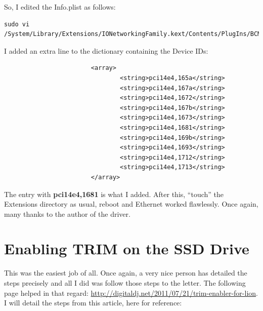 \documentclass[11pt]{article}
\begin{document}
So, I edited the Info.plist as follows:
\begin{verbatim}
sudo vi /System/Library/Extensions/IONetworkingFamily.kext/Contents/PlugIns/BCM5722D.kext/Contents/Info.plist
\end{verbatim}
I added an extra line to the dictionary containing the Device IDs:
\begin{verbatim}
                        <array>
                                <string>pci14e4,165a</string>
                                <string>pci14e4,167a</string>
                                <string>pci14e4,1672</string>
                                <string>pci14e4,167b</string>
                                <string>pci14e4,1673</string>
                                <string>pci14e4,1681</string>
                                <string>pci14e4,169b</string>
                                <string>pci14e4,1693</string>
                                <string>pci14e4,1712</string>
                                <string>pci14e4,1713</string>
                        </array>
\end{verbatim}
The entry with {\bf pci14e4,1681} is what I added.  After this, ``touch'' the Extensions directory as usual, reboot and Ethernet worked flawlessly.  Once again, many thanks to the author of the driver.

\section{Enabling TRIM on the SSD Drive}

This was the easiest job of all.  Once again, a very nice person has detailed the steps precisely and all I did was follow those steps to the letter.  The following page helped in that regard: \url{http://digitaldj.net/2011/07/21/trim-enabler-for-lion}.  I will detail the steps from this article, here for reference:
\end{document}
